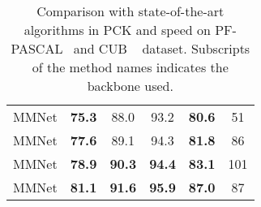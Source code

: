 \begin{table}
\begin{adjustbox}{max width=80 mm}
\begin{tabular}{l| c c c| c|c }
    \hline
    MMNet  & \textbf{75.3} & 88.0& 93.2&\textbf{80.6} &51\\
    MMNet  & \textbf{77.6} & 89.1& 94.3&\textbf{81.8} &86\\
    MMNet  & \textbf{78.9} & \textbf{90.3}& \textbf{94.4}&\textbf{83.1}& 101\\
    MMNet  & \textbf{81.1} & \textbf{91.6}& \textbf{95.9}&\textbf{87.0} &87\\
    \bottomrule[1pt]
\end{tabular}
\end{adjustbox}
\vspace{2pt}
\caption{Comparison with state-of-the-art algorithms in PCK and speed on PF-PASCAL~\cite{ham2017proposal} and CUB ~\cite{cub} dataset. Subscripts of the method names indicates the backbone used.}\label{Tab:quant_results}
\end{table}



